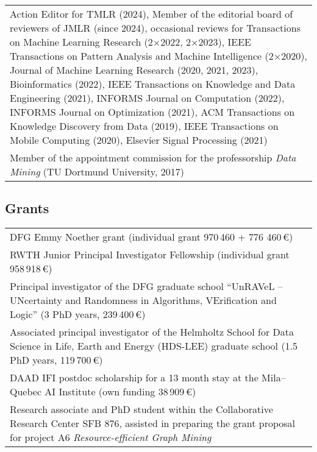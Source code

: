 \documentclass[11pt, a4paper, DIV=14, headings=small]{scrartcl}
\begin{document}
\begin{longtabu}{p{14.5cm}}
		Action Editor for TMLR (2024), Member of the editorial board of reviewers of JMLR (since 2024), occasional reviews for Transactions on Machine Learning Research (2$\times$2022, 2$\times$2023), IEEE Transactions on Pattern Analysis and Machine Intelligence (2$\times$2020), Journal of Machine Learning Research (2020, 2021, 2023), Bioinformatics (2022), IEEE Transactions on Knowledge and Data Engineering (2021), INFORMS Journal on Computation (2022), INFORMS Journal on Optimization (2021), ACM Transactions on Knowledge Discovery from Data (2019), IEEE Transactions on Mobile Computing (2020), Elsevier Signal Processing (2021)                                                                                                                                                                                                                                                                                                                                                                         \\
		
		Member of the appointment commission for the professorship \emph{Data Mining} (TU Dortmund University, 2017)
	\end{longtabu}

	\subsection*{Grants}
	\begin{longtabu}{p{14.5cm}} 
		DFG Emmy Noether grant (individual grant 970\,460 + 776 460\,€)\\   
	
		RWTH Junior Principal Investigator Fellowship (individual grant 958\,918\,€)  \\
		 	
		Principal investigator of the DFG graduate school ``UnRAVeL -- UNcertainty and Randomness in Algorithms, VErification and Logic''  (3 PhD years, 239\,400\,€) \\
				
		Associated principal investigator of the Helmholtz School for Data Science in Life, Earth and Energy (HDS-LEE) graduate school (1.5 PhD years, 119\,700\,€) \\
		
		DAAD IFI postdoc scholarship for a 13 month stay at the Mila--Quebec AI Institute (own funding 38\,909\,€) \\
		
		Research associate and PhD student  within the Collaborative Research Center SFB 876, assisted in preparing the  grant proposal for project A6 \emph{Resource-efficient Graph Mining}\\
	\end{longtabu}
	
\end{document}
